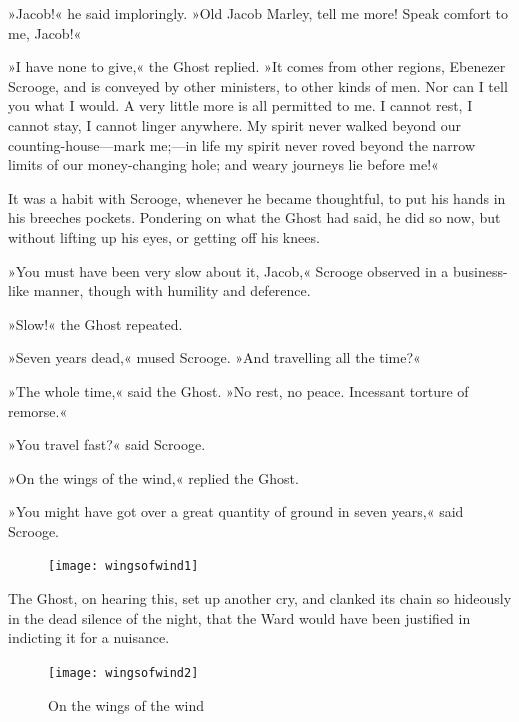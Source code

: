 »Jacob!« he said imploringly. »Old Jacob Marley, tell me more! Speak comfort to me, Jacob!«



»I have none to give,« the Ghost replied. »It comes from other regions, Ebenezer Scrooge, and is conveyed by other ministers, to other kinds of men. Nor can I tell you what I would. A very little more is all permitted to me. I cannot rest, I cannot stay, I cannot linger anywhere. My spirit never walked beyond our counting-house—mark me;—in life my spirit never roved beyond the narrow limits of our money-changing hole; and weary journeys lie before me!«



It was a habit with Scrooge, whenever he became thoughtful, to put his hands in his breeches pockets. Pondering on what the Ghost had said, he did so now, but without lifting up his eyes, or getting off his knees.

»You must have been very slow about it, Jacob,« Scrooge observed in a business-like manner, though with humility and deference.



»Slow!« the Ghost repeated.

»Seven years dead,« mused Scrooge. »And travelling all the time?«



»The whole time,« said the Ghost. »No rest, no peace. Incessant torture of remorse.«

»You travel fast?« said Scrooge.

»On the wings of the wind,« replied the Ghost. 

»You might have got over a great quantity of ground in seven years,« said Scrooge.

\begin{figure}[t!]
\centering
\vfill
    \texttt{[image: wingsofwind1]}
    \vfill
\end{figure}

The Ghost, on hearing this, set up another cry, and clanked its chain so hideously in the dead silence of the night, that the Ward would have been justified in indicting it for a nuisance.

\makeatletter
{}
{%

}{%
	\begin{figure}[b!]
		\centering
		\texttt{[image: wingsofwind2]}
		\caption{On the wings of the wind}
	\end{figure}
}
\makeatother

